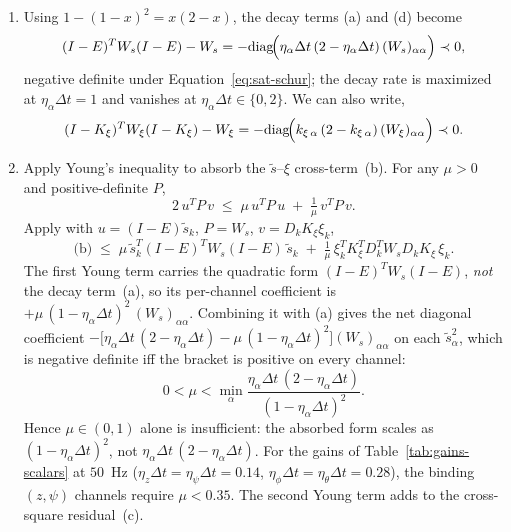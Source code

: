 \documentclass[conf]{new-aiaa}
\begin{document}
\begin{enumerate}
\item Using $1 - (1-x)^2 = x(2 - x)$, the decay terms (a) and (d) become
\small
\begin{equation}
(I-E)^T W_s (I-E) - W_s
= -\mathrm{diag}\!\Bigl( \eta_\alpha \Delta t\, (2 - \eta_\alpha \Delta t)\, (W_s)_{\alpha\alpha} \Bigr) \prec 0,
\end{equation}
\normalsize
negative definite under Equation~\ref{eq:sat-schur}; the decay rate is maximized at $\eta_\alpha \Delta t = 1$ and vanishes at $\eta_\alpha \Delta t \in \{0, 2\}$. We can also write,
\small
\begin{equation}
(I-K_\xi)^T W_\xi (I-K_\xi) - W_\xi = -\mathrm{diag}\!\Bigl( k_{\xi\,\alpha}\, (2 - k_{\xi\,\alpha})\, (W_\xi)_{\alpha\alpha} \Bigr) \prec 0.
\end{equation}
\normalsize

\item Apply Young’s inequality to absorb the $\tilde s$–$\xi$ cross-term~(b). For any $\mu > 0$ and positive-definite $P$,
\begin{equation}
\label{eq:sat-young-template}
2\, u^T P\, v \;\leq\; \mu\, u^T P\, u \;+\; \tfrac{1}{\mu}\, v^T P\, v.
\end{equation}
Apply with $u = (I-E) \tilde s_k$, $P = W_s$, $v = D_k K_\xi \xi_k$,
\small
\begin{equation}
\label{eq:sat-young}
\text{(b)} \;\leq\; \mu\, \tilde s_k^T (I-E)^T W_s (I-E)\, \tilde s_k
\;+\; \tfrac{1}{\mu}\, \xi_k^T K_\xi^T D_k^T W_s D_k K_\xi\, \xi_k.
\end{equation}
\normalsize
The first Young term carries the quadratic form $(I-E)^T W_s (I-E)$, \emph{not} the decay term~(a), so its per-channel coefficient is $+\mu\,(1 - \eta_\alpha \Delta t)^2\, (W_s)_{\alpha\alpha}$. Combining it with (a) gives the net diagonal coefficient $-\bigl[\eta_\alpha \Delta t\,(2 - \eta_\alpha \Delta t) - \mu\,(1 - \eta_\alpha \Delta t)^2\bigr](W_s)_{\alpha\alpha}$ on each $\tilde s_\alpha^2$, which is negative definite iff the bracket is positive on every channel:
\begin{equation}
\label{eq:sat-mu-bound}
0 < \mu < \min_\alpha \frac{\eta_\alpha \Delta t\,(2 - \eta_\alpha \Delta t)}{(1 - \eta_\alpha \Delta t)^2}.
\end{equation}
Hence $\mu \in (0,1)$ alone is insufficient: the absorbed form scales as $(1-\eta_\alpha\Delta t)^2$, not $\eta_\alpha\Delta t\,(2-\eta_\alpha\Delta t)$. For the gains of Table~\ref{tab:gains-scalars} at $50$~Hz ($\eta_z\Delta t = \eta_\psi\Delta t = 0.14$, $\eta_\phi\Delta t = \eta_\theta\Delta t = 0.28$), the binding $(z,\psi)$ channels require $\mu < 0.35$. The second Young term adds to the cross-square residual~(c).


\end{enumerate}
\end{document}
